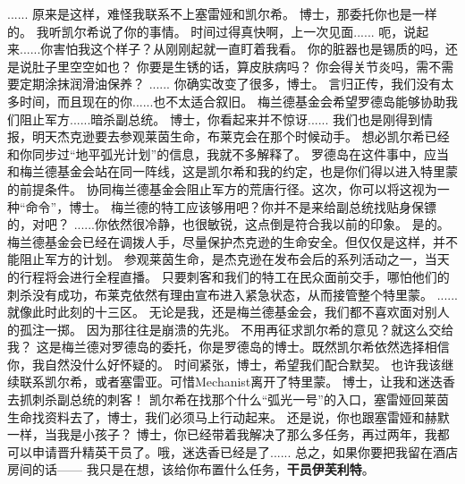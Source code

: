 \documentclass[openany]{book}
\begin{document}
\begin{dialogue}
     ......
     原来是这样，难怪我联系不上塞雷娅和凯尔希。
     博士，那委托你也是一样的。
     我听凯尔希说了你的事情。
     时间过得真快啊，上一次见面......
     呃，说起来......你害怕我这个样子？从刚刚起就一直盯着我看。
     你的脏器也是锡质的吗，还是说肚子里空空如也？
     你要是生锈的话，算皮肤病吗？
     你会得关节炎吗，需不需要定期涂抹润滑油保养？
     ......
     你确实改变了很多，博士。
     言归正传，我们没有太多时间，而且现在的你......也不太适合叙旧。
     梅兰德基金会希望罗德岛能够协助我们阻止军方......暗杀副总统。
     博士，你看起来并不惊讶......
     我们也是刚得到情报，明天杰克逊要去参观莱茵生命，布莱克会在那个时候动手。
     想必凯尔希已经和你同步过“地平弧光计划”的信息，我就不多解释了。
     罗德岛在这件事中，应当和梅兰德基金会站在同一阵线，这是凯尔希和我的约定，也是你们得以进入特里蒙的前提条件。
     协同梅兰德基金会阻止军方的荒唐行径。这次，你可以将这视为一种“命令”，博士。
     梅兰德的特工应该够用吧？你并不是来给副总统找贴身保镖的，对吧？
     ......你依然很冷静，也很敏锐，这点倒是符合我以前的印象。
     是的。梅兰德基金会已经在调拨人手，尽量保护杰克逊的生命安全。但仅仅是这样，并不能阻止军方的计划。
     参观莱茵生命，是杰克逊在发布会后的系列活动之一，当天的行程将会进行全程直播。
     只要刺客和我们的特工在民众面前交手，哪怕他们的刺杀没有成功，布莱克依然有理由宣布进入紧急状态，从而接管整个特里蒙。
     ......就像此时此刻的十三区。
     无论是我，还是梅兰德基金会，我们都不喜欢面对别人的孤注一掷。
     因为那往往是崩溃的先兆。
     不用再征求凯尔希的意见？就这么交给我？
     这是梅兰德对罗德岛的委托，你是罗德岛的博士。既然凯尔希依然选择相信你，我自然没什么好怀疑的。
     时间紧张，博士，希望我们配合默契。
     也许我该继续联系凯尔希，或者塞雷亚。可惜Mechanist离开了特里蒙。
     博士，让我和迷迭香去抓刺杀副总统的刺客！
     凯尔希在找那个什么“弧光一号”的入口，塞雷娅回莱茵生命找资料去了，博士，我们必须马上行动起来。
     还是说，你也跟塞雷娅和赫默一样，当我是小孩子？
     博士，你已经带着我解决了那么多任务，再过两年，我都可以申请晋升精英干员了。哦，迷迭香已经是了......
     总之，如果你要把我留在酒店房间的话——
     我只是在想，该给你布置什么任务，\textbf{干员伊芙利特}。
\end{dialogue}
\end{document}

